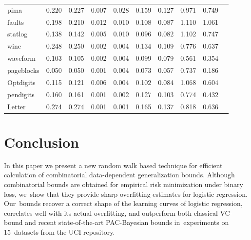 \documentclass{article} %
\begin{document}
\begin{table}[t]
\begin{tabular}[t]{||l||r|r|r||r|r|r|r|r|r||}
            pima        & 0.220 & 0.227 & 0.007 & 0.028 & 0.159 & 0.127 & 0.971 & 0.749 \\
            faults      & 0.198 & 0.210 & 0.012 & 0.010 & 0.108 & 0.087 & 1.110 & 1.061 \\
            statlog     & 0.138 & 0.142 & 0.005 & 0.010 & 0.096 & 0.082 & 1.102 & 0.747 \\
            wine        & 0.248 & 0.250 & 0.002 & 0.004 & 0.134 & 0.109 & 0.776 & 0.637 \\
            waveform    & 0.103 & 0.105 & 0.002 & 0.004 & 0.099 & 0.079 & 0.561 & 0.354 \\
            pageblocks  & 0.050 & 0.050 & 0.001 & 0.004 & 0.073 & 0.057 & 0.737 & 0.186 \\
            Optdigits   & 0.115 & 0.121 & 0.006 & 0.004 & 0.102 & 0.084 & 1.068 & 0.604 \\
            pendigits   & 0.160 & 0.161 & 0.001 & 0.002 & 0.127 & 0.103 & 0.774 & 0.432 \\
            Letter      & 0.274 & 0.274 & 0.001 & 0.001 & 0.165 & 0.137 & 0.818 & 0.636 \\
        \hline
        \end{tabular}
    \end{table}

\section{Conclusion}
In this paper we present a new random walk based technique for efficient calculation of
combinatorial data-dependent generalization bounds.
Although combinatorial bounds are obtained for empirical risk minimization under binary loss,
we~show that they provide sharp overfitting estimates for logistic regression.
Our~bounds
recover a correct shape of the learning curves of logistic regression,
correlates well with its actual overfitting,
and outperform  both classical VC-bound and recent state-of-the-art PAC-Bayesian bounds
in~experiments on 15~datasets from the UCI repository.
\end{document}

